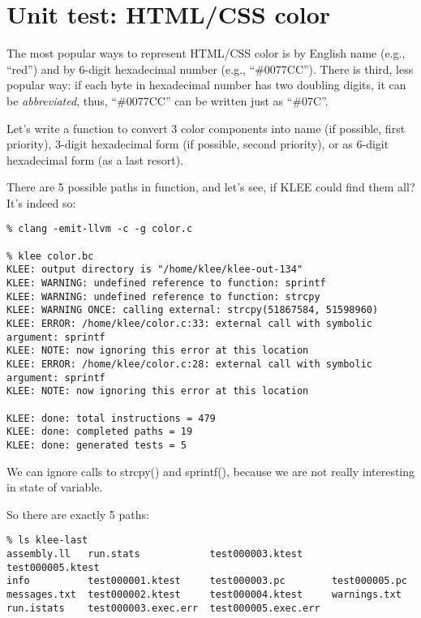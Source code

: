 \section{Unit test: HTML/CSS color}

The most popular ways to represent HTML/CSS color is by English name (e.g., ``red'') and by 6-digit hexadecimal number (e.g., ``\#0077CC'').
There is third, less popular way: if each byte in hexadecimal number has two doubling digits, it can be \emph{abbreviated}, thus, 
``\#0077CC'' can be written just as ``\#07C''.

Let's write a function to convert 3 color components into name (if possible, first priority), 3-digit hexadecimal form (if possible, second priority),
or as 6-digit hexadecimal form (as a last resort).



There are 5 possible paths in function, and let's see, if KLEE could find them all?
It's indeed so:

\begin{lstlisting}
% clang -emit-llvm -c -g color.c

% klee color.bc
KLEE: output directory is "/home/klee/klee-out-134"
KLEE: WARNING: undefined reference to function: sprintf
KLEE: WARNING: undefined reference to function: strcpy
KLEE: WARNING ONCE: calling external: strcpy(51867584, 51598960)
KLEE: ERROR: /home/klee/color.c:33: external call with symbolic argument: sprintf
KLEE: NOTE: now ignoring this error at this location
KLEE: ERROR: /home/klee/color.c:28: external call with symbolic argument: sprintf
KLEE: NOTE: now ignoring this error at this location

KLEE: done: total instructions = 479
KLEE: done: completed paths = 19
KLEE: done: generated tests = 5
\end{lstlisting}

We can ignore calls to strcpy() and sprintf(), because we are not really interesting in state of  variable.

So there are exactly 5 paths:

\begin{lstlisting}
% ls klee-last
assembly.ll   run.stats            test000003.ktest     test000005.ktest
info          test000001.ktest     test000003.pc        test000005.pc
messages.txt  test000002.ktest     test000004.ktest     warnings.txt
run.istats    test000003.exec.err  test000005.exec.err
\end{lstlisting}

